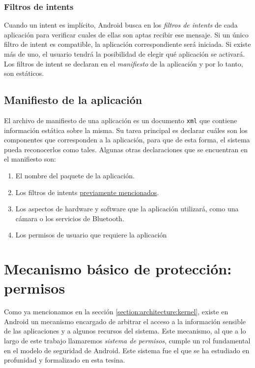 \subsubsection*{Filtros de intents}
\label{section:preliminary:intent-filter}
Cuando un intent es implícito, Android busca en los \textit{filtros de intents} de cada aplicación
para verificar cuales de ellas son aptas recibir ese mensaje. Si un único filtro de intent es
compatible, la aplicación correspondiente será iniciada. Si existe más de uno, el usuario tendrá la
posibilidad de elegir qué aplicación se activará. Los filtros de intent se declaran en el
\textit{manifiesto} de la aplicación y por lo tanto, son estáticos.

\subsection{Manifiesto de la aplicación}
El archivo de manifiesto de una aplicación es un documento \texttt{xml} que contiene información
estática sobre la misma. Su tarea principal es declarar cuáles son los componentes que corresponden a
la aplicación, para que de esta forma, el sistema pueda reconocerlos como tales. Algunas otras
declaraciones que se encuentran en el manifiesto son:
\begin{enumerate}
    \item El nombre del paquete de la aplicación.
    \item Los filtros de intents \hyperref[section:preliminary:intent-filter]{previamente mencionados}.
    \item Los aspectos de hardware y software que la aplicación utilizará, como una cámara o los
          servicios de Bluetooth.
    \item Los permisos de usuario que requiere la aplicación
\end{enumerate}

\section{Mecanismo básico de protección: permisos}
Como ya mencionamos en la sección \ref{section:architecture:kernel}, existe en Android un mecanismo
encargado de arbitrar el acceso a la información sensible de las aplicaciones y a algunos recursos del
sistema. Este mecanismo, al que a lo largo de este trabajo llamaremos \textit{sistema de permisos},
cumple un rol fundamental en el modelo de seguridad de Android. Este sistema fue el que se ha estudiado
en profunidad y formalizado en esta tesina.


